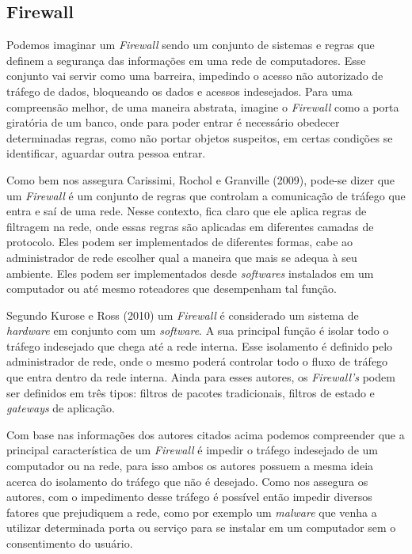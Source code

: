 \subsection{Firewall}
Podemos imaginar um \textit{Firewall} sendo um conjunto de sistemas e regras que definem a segurança das informações em uma rede de computadores. Esse conjunto vai servir como uma barreira, impedindo o acesso não autorizado de tráfego de dados, bloqueando os dados e acessos indesejados. Para uma compreensão melhor, de uma maneira abstrata, imagine o \textit{Firewall} como a porta giratória de um banco, onde para poder entrar é necessário obedecer determinadas regras, como não portar objetos suspeitos, em certas condições se identificar, aguardar outra pessoa entrar.

Como bem nos assegura Carissimi, Rochol e Granville (2009), pode-se dizer que um \textit{Firewall} é um conjunto de regras que controlam a comunicação de tráfego que entra e saí de uma rede. Nesse contexto, fica claro que ele aplica regras de filtragem na rede, onde essas regras são aplicadas em diferentes camadas de protocolo. Eles podem ser implementados de diferentes formas, cabe ao administrador de rede escolher qual a maneira que mais se adequa à seu ambiente. Eles podem ser implementados desde \textit{softwares} instalados em um computador ou até mesmo roteadores que desempenham tal função.

Segundo Kurose e Ross (2010) um \textit{Firewall} é considerado um sistema de \textit{hardware} em conjunto com um \textit{software}. A sua principal função é isolar todo o tráfego indesejado que chega até a rede interna. Esse isolamento é definido pelo administrador de rede, onde o mesmo poderá controlar todo o fluxo de tráfego que entra dentro da rede interna. Ainda para esses autores, os \textit{Firewall's} podem ser definidos em três tipos: filtros de pacotes tradicionais, filtros de estado e \textit{gateways} de aplicação.

Com base nas informações dos autores citados acima podemos compreender que a principal característica de um \textit{Firewall} é impedir o tráfego indesejado de um computador ou na rede, para isso ambos os autores possuem a mesma ideia acerca do isolamento do tráfego que não é desejado. Como nos assegura os autores, com o impedimento desse tráfego é possível então impedir diversos fatores que prejudiquem a rede, como por exemplo um \textit{malware} que venha a utilizar determinada porta ou serviço para se instalar em um computador sem o consentimento do usuário.

